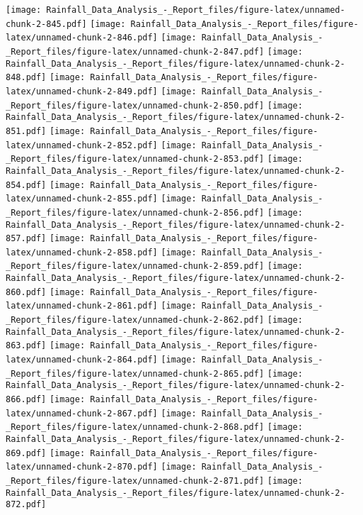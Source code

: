 \documentclass[
]{article}
\begin{document}
\texttt{[image: Rainfall\_Data\_Analysis\_-\_Report\_files/figure-latex/unnamed-chunk-2-845.pdf]}
\texttt{[image: Rainfall\_Data\_Analysis\_-\_Report\_files/figure-latex/unnamed-chunk-2-846.pdf]}
\texttt{[image: Rainfall\_Data\_Analysis\_-\_Report\_files/figure-latex/unnamed-chunk-2-847.pdf]}
\texttt{[image: Rainfall\_Data\_Analysis\_-\_Report\_files/figure-latex/unnamed-chunk-2-848.pdf]}
\texttt{[image: Rainfall\_Data\_Analysis\_-\_Report\_files/figure-latex/unnamed-chunk-2-849.pdf]}
\texttt{[image: Rainfall\_Data\_Analysis\_-\_Report\_files/figure-latex/unnamed-chunk-2-850.pdf]}
\texttt{[image: Rainfall\_Data\_Analysis\_-\_Report\_files/figure-latex/unnamed-chunk-2-851.pdf]}
\texttt{[image: Rainfall\_Data\_Analysis\_-\_Report\_files/figure-latex/unnamed-chunk-2-852.pdf]}
\texttt{[image: Rainfall\_Data\_Analysis\_-\_Report\_files/figure-latex/unnamed-chunk-2-853.pdf]}
\texttt{[image: Rainfall\_Data\_Analysis\_-\_Report\_files/figure-latex/unnamed-chunk-2-854.pdf]}
\texttt{[image: Rainfall\_Data\_Analysis\_-\_Report\_files/figure-latex/unnamed-chunk-2-855.pdf]}
\texttt{[image: Rainfall\_Data\_Analysis\_-\_Report\_files/figure-latex/unnamed-chunk-2-856.pdf]}
\texttt{[image: Rainfall\_Data\_Analysis\_-\_Report\_files/figure-latex/unnamed-chunk-2-857.pdf]}
\texttt{[image: Rainfall\_Data\_Analysis\_-\_Report\_files/figure-latex/unnamed-chunk-2-858.pdf]}
\texttt{[image: Rainfall\_Data\_Analysis\_-\_Report\_files/figure-latex/unnamed-chunk-2-859.pdf]}
\texttt{[image: Rainfall\_Data\_Analysis\_-\_Report\_files/figure-latex/unnamed-chunk-2-860.pdf]}
\texttt{[image: Rainfall\_Data\_Analysis\_-\_Report\_files/figure-latex/unnamed-chunk-2-861.pdf]}
\texttt{[image: Rainfall\_Data\_Analysis\_-\_Report\_files/figure-latex/unnamed-chunk-2-862.pdf]}
\texttt{[image: Rainfall\_Data\_Analysis\_-\_Report\_files/figure-latex/unnamed-chunk-2-863.pdf]}
\texttt{[image: Rainfall\_Data\_Analysis\_-\_Report\_files/figure-latex/unnamed-chunk-2-864.pdf]}
\texttt{[image: Rainfall\_Data\_Analysis\_-\_Report\_files/figure-latex/unnamed-chunk-2-865.pdf]}
\texttt{[image: Rainfall\_Data\_Analysis\_-\_Report\_files/figure-latex/unnamed-chunk-2-866.pdf]}
\texttt{[image: Rainfall\_Data\_Analysis\_-\_Report\_files/figure-latex/unnamed-chunk-2-867.pdf]}
\texttt{[image: Rainfall\_Data\_Analysis\_-\_Report\_files/figure-latex/unnamed-chunk-2-868.pdf]}
\texttt{[image: Rainfall\_Data\_Analysis\_-\_Report\_files/figure-latex/unnamed-chunk-2-869.pdf]}
\texttt{[image: Rainfall\_Data\_Analysis\_-\_Report\_files/figure-latex/unnamed-chunk-2-870.pdf]}
\texttt{[image: Rainfall\_Data\_Analysis\_-\_Report\_files/figure-latex/unnamed-chunk-2-871.pdf]}
\texttt{[image: Rainfall\_Data\_Analysis\_-\_Report\_files/figure-latex/unnamed-chunk-2-872.pdf]}
\end{document}
